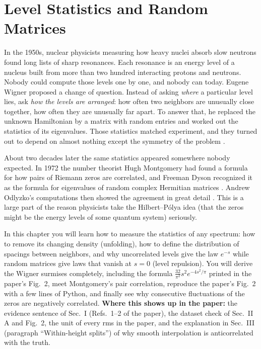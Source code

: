 \chapter{Level Statistics and Random Matrices}\label{ch:level-statistics}

\begin{chapterintro}
In the 1950s, nuclear physicists measuring how heavy nuclei absorb slow neutrons found long lists of sharp resonances. Each resonance is an energy level of a nucleus built from more than two hundred interacting protons and neutrons. Nobody could compute those levels one by one, and nobody can today. Eugene Wigner proposed a change of question. Instead of asking \emph{where} a particular level lies, ask \emph{how the levels are arranged}: how often two neighbors are unusually close together, how often they are unusually far apart. To answer that, he replaced the unknown Hamiltonian by a matrix with random entries and worked out the statistics of its eigenvalues. Those statistics matched experiment, and they turned out to depend on almost nothing except the symmetry of the problem \cite{mehta}.

About two decades later the same statistics appeared somewhere nobody expected. In 1972 the number theorist Hugh Montgomery had found a formula for how pairs of Riemann zeros are correlated, and Freeman Dyson recognized it as the formula for eigenvalues of random complex Hermitian matrices \cite{montgomery}. Andrew Odlyzko's computations then showed the agreement in great detail \cite{odlyzko87}. This is a large part of the reason physicists take the Hilbert--P\'olya idea (that the zeros might be the energy levels of some quantum system) seriously.

In this chapter you will learn how to measure the statistics of any spectrum: how to remove its changing density (unfolding), how to define the distribution of spacings between neighbors, and why uncorrelated levels give the law $e^{-s}$ while random matrices give laws that vanish at $s=0$ (level repulsion). You will derive the Wigner surmises completely, including the formula $\frac{32}{\pi^2}s^2e^{-4s^2/\pi}$ printed in the paper's Fig.~2, meet Montgomery's pair correlation, reproduce the paper's Fig.~2 with a few lines of Python, and finally see why consecutive fluctuations of the zeros are negatively correlated. \textbf{Where this shows up in the paper:} the evidence sentence of Sec.~I (Refs.~1--2 of the paper), the dataset check of Sec.~II A and Fig.~2, the unit of every rms in the paper, and the explanation in Sec.~III (paragraph ``Within-height splits'') of why smooth interpolation is anticorrelated with the truth.
\end{chapterintro}

